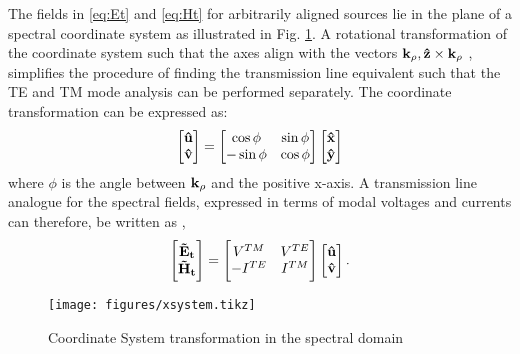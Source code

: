 \documentclass[12pt]{article}
\begin{document}
The fields in \eqref{eq:Et} and  \eqref{eq:Ht} for arbitrarily aligned sources lie in the plane of a spectral coordinate system as illustrated in Fig. \ref{fig:SpCS}. A rotational transformation of the coordinate system such that the axes align with the vectors $\mathbf{k_{\rho}}, \mathbf{\hat z} \times \mathbf{k_{\rho}}$ \cite{itoh1980}, simplifies the procedure of finding the transmission line equivalent such that the TE and TM mode analysis can be performed separately. The coordinate transformation can be expressed as:
%
\begin{equation}
  \begin{bmatrix}
    \mathbf{\hat u} \\
    \mathbf{\hat v}
  \end{bmatrix}
  =
  \begin{bmatrix}
    \cos \phi & \sin \phi \\
    -\sin \phi & \cos \phi
  \end{bmatrix}
  \begin{bmatrix}
    \mathbf{\hat x} \\
    \mathbf{\hat y}
  \end{bmatrix}
  \label{eq:transformation}
\end{equation}
%
where $\phi$ is the angle between $\mathbf{k_{\rho}}$ and the positive x-axis. A transmission line analogue for the spectral fields, expressed in terms of modal voltages and currents can therefore, be written as \cite{kastner1988, michalski1997multilayered},
%
\begin{equation}
  \begin{bmatrix}
    \mathbf{\tilde{E}_t} \\
    \mathbf{\tilde{H}_t}
  \end{bmatrix}
  =
  \begin{bmatrix}
    V^{TM} & V^{TE} \\
    -I^{TE} & I^{TM}
  \end{bmatrix}
  \begin{bmatrix}
    \mathbf{\hat u} \\
    \mathbf{\hat v}
  \end{bmatrix}.
  \label{eq:EHVI}
\end{equation}
%
\begin{figure}[t!]
  \centering
  \texttt{[image: figures/xsystem.tikz]}
  \caption{Coordinate System transformation in the spectral domain}
  \label{fig:SpCS}
\end{figure}
\end{document}
